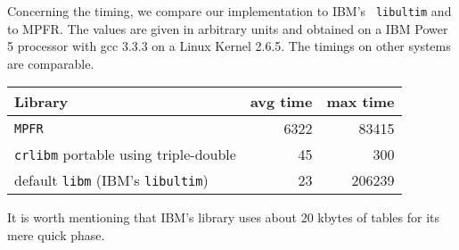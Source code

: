 Concerning the timing, we compare our implementation to IBM's {\tt
  libultim} and to MPFR. The values are given in arbitrary units and
obtained on a IBM Power 5 processor with gcc 3.3.3 on a Linux Kernel
2.6.5. The timings on other systems are comparable.
\begin{center}
\begin{tabular}{|l|r|r|}
 \hline
  Library                       &     avg time  & max time \\
 \hline
 \hline
 \texttt{MPFR}   &   6322    & 83415        \\
 \hline
 \texttt{crlibm} portable using triple-double      &        45    & 300        \\
 \hline
 default \texttt{libm} (IBM's {\tt libultim})  &        23    & 206239      \\
 \hline
\end{tabular}
\end{center}
It is worth mentioning that IBM's library uses about 20 kbytes of
tables for its mere quick phase.

